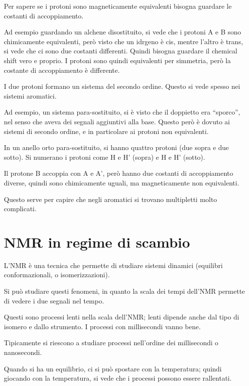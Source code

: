 Per sapere se i protoni sono magneticamente equivalenti bisogna guardare
le costanti di accoppiamento.


Ad esempio guardando un alchene disostituito, si vede che i protoni A e B sono
chimicamente equivalenti, però visto che un idrgeno è cis, mentre
l'altro è trans, si vede che ci sono due costanti differenti. Quindi
bisogna guardare il chemical shift vero e proprio.
I protoni sono quindi equivalenti per simmetria, però la costante di accoppiamento è
differente.

I due protoni formano un sistema del secondo ordine. Questo si vede
spesso nei sistemi aromatici.


Ad esempio, un sistema para-sostituito, si è visto che il doppietto era
``sporco'', nel senso che aveva dei segnali aggiuntivi alla base. Questo
però è dovuto ai sistemi di secondo ordine, e in particolare ai protoni
non equivalenti.

In un anello orto para-sostituito, si hanno quattro protoni (due sopra e
due sotto). Si numerano i protoni come H e H' (sopra) e H e H'
(sotto).

Il protone B accoppia con A e A', però hanno due costanti
di accoppiamento diverse, quindi sono chimicamente uguali, ma
magneticamente non equivalenti.

Questo serve per capire che negli aromatici si trovano multipletti molto
complicati.


\section{NMR in regime di scambio}

L'NMR è una tecnica che permette di studiare sistemi dinamici (equilibri
conformazionali, o isomerizzazioni).

Si può studiare questi fenomeni, in quanto la scala dei tempi dell'NMR
permette di vedere i due segnali nel tempo.

Questi sono processi lenti nella scala dell'NMR; lenti dipende anche dal
tipo di isomero e dallo strumento. I processi con millisecondi vanno
bene.

Tipicamente si riescono a studiare processi nell'ordine dei millisecondi
o nanosecondi.

Quando si ha un equilibrio, ci si può spostare con la temperatura;
quindi giocando con la temperatura, si vede che i processi possono
essere rallentati.

